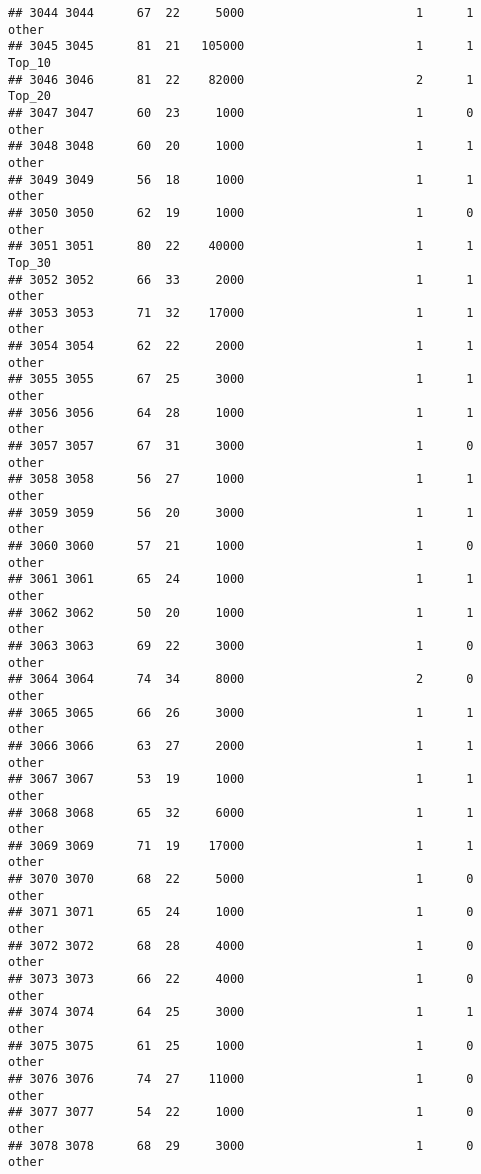 \documentclass[
]{article}
\begin{document}
\begin{verbatim}
## 3044 3044      67  22     5000                        1      1    other
## 3045 3045      81  21   105000                        1      1   Top_10
## 3046 3046      81  22    82000                        2      1   Top_20
## 3047 3047      60  23     1000                        1      0    other
## 3048 3048      60  20     1000                        1      1    other
## 3049 3049      56  18     1000                        1      1    other
## 3050 3050      62  19     1000                        1      0    other
## 3051 3051      80  22    40000                        1      1   Top_30
## 3052 3052      66  33     2000                        1      1    other
## 3053 3053      71  32    17000                        1      1    other
## 3054 3054      62  22     2000                        1      1    other
## 3055 3055      67  25     3000                        1      1    other
## 3056 3056      64  28     1000                        1      1    other
## 3057 3057      67  31     3000                        1      0    other
## 3058 3058      56  27     1000                        1      1    other
## 3059 3059      56  20     3000                        1      1    other
## 3060 3060      57  21     1000                        1      0    other
## 3061 3061      65  24     1000                        1      1    other
## 3062 3062      50  20     1000                        1      1    other
## 3063 3063      69  22     3000                        1      0    other
## 3064 3064      74  34     8000                        2      0    other
## 3065 3065      66  26     3000                        1      1    other
## 3066 3066      63  27     2000                        1      1    other
## 3067 3067      53  19     1000                        1      1    other
## 3068 3068      65  32     6000                        1      1    other
## 3069 3069      71  19    17000                        1      1    other
## 3070 3070      68  22     5000                        1      0    other
## 3071 3071      65  24     1000                        1      0    other
## 3072 3072      68  28     4000                        1      0    other
## 3073 3073      66  22     4000                        1      0    other
## 3074 3074      64  25     3000                        1      1    other
## 3075 3075      61  25     1000                        1      0    other
## 3076 3076      74  27    11000                        1      0    other
## 3077 3077      54  22     1000                        1      0    other
## 3078 3078      68  29     3000                        1      0    other

\end{verbatim}
\end{document}
